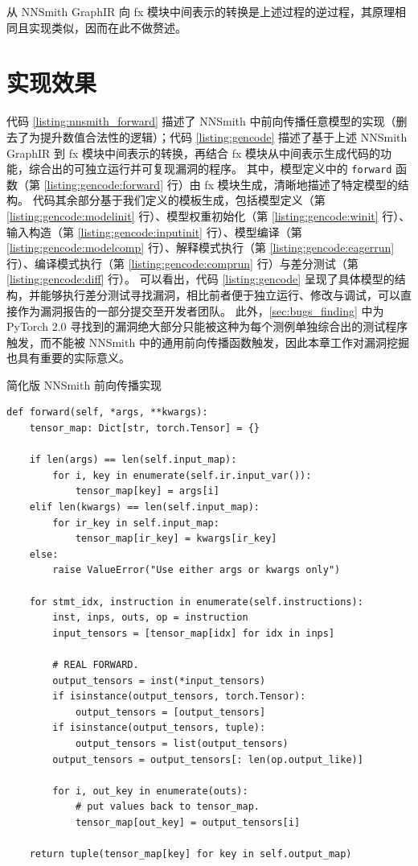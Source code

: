 从 NNSmith GraphIR 向 fx 模块中间表示的转换是上述过程的逆过程，其原理相同且实现类似，因而在此不做赘述。

\section{实现效果}

代码 \ref{listing:nnsmith_forward} 描述了 NNSmith 中前向传播任意模型的实现（删去了为提升数值合法性的逻辑）；代码 \ref{listing:gencode} 描述了基于上述 NNSmith GraphIR 到 fx 模块中间表示的转换，再结合 fx 模块从中间表示生成代码的功能，综合出的可独立运行并可复现漏洞的程序。
其中，模型定义中的 \texttt{forward} 函数（第 \ref{listing:gencode:forward} 行）由 fx 模块生成，清晰地描述了特定模型的结构。
代码其余部分基于我们定义的模板生成，包括模型定义（第 \ref{listing:gencode:modelinit} 行）、模型权重初始化（第 \ref{listing:gencode:winit} 行）、输入构造（第 \ref{listing:gencode:inputinit} 行）、模型编译（第 \ref{listing:gencode:modelcomp} 行）、解释模式执行（第 \ref{listing:gencode:eagerrun} 行）、编译模式执行（第 \ref{listing:gencode:comprun} 行）与差分测试（第 \ref{listing:gencode:diff} 行）。
可以看出，代码 \ref{listing:gencode} 呈现了具体模型的结构，并能够执行差分测试寻找漏洞，相比前者便于独立运行、修改与调试，可以直接作为漏洞报告的一部分提交至开发者团队。
此外，\ref{sec:bugs_finding} 中为 PyTorch 2.0 寻找到的漏洞绝大部分只能被这种为每个测例单独综合出的测试程序触发，而不能被 NNSmith 中的通用前向传播函数触发，因此本章工作对漏洞挖掘也具有重要的实际意义。

\begin{listing}[]
    \caption{简化版 NNSmith 前向传播实现}
    \label{listing:nnsmith_forward}
\begin{verbatim}
def forward(self, *args, **kwargs):
    tensor_map: Dict[str, torch.Tensor] = {}

    if len(args) == len(self.input_map):
        for i, key in enumerate(self.ir.input_var()):
            tensor_map[key] = args[i]
    elif len(kwargs) == len(self.input_map):
        for ir_key in self.input_map:
            tensor_map[ir_key] = kwargs[ir_key]
    else:
        raise ValueError("Use either args or kwargs only")

    for stmt_idx, instruction in enumerate(self.instructions):
        inst, inps, outs, op = instruction
        input_tensors = [tensor_map[idx] for idx in inps]

        # REAL FORWARD.
        output_tensors = inst(*input_tensors)
        if isinstance(output_tensors, torch.Tensor):
            output_tensors = [output_tensors]
        if isinstance(output_tensors, tuple):
            output_tensors = list(output_tensors)
        output_tensors = output_tensors[: len(op.output_like)]

        for i, out_key in enumerate(outs):
            # put values back to tensor_map.
            tensor_map[out_key] = output_tensors[i]
            
    return tuple(tensor_map[key] for key in self.output_map)
\end{verbatim}
\end{listing}

